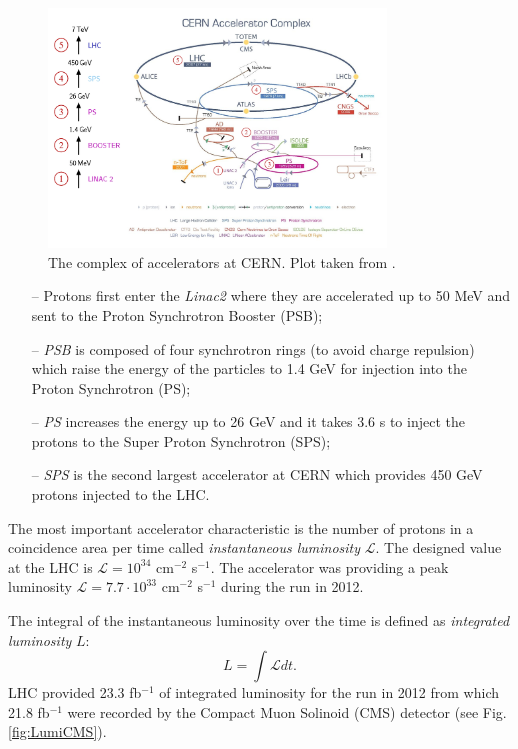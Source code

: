 \begin{figure}[t]
  \centering
  \includegraphics[width=0.8\textwidth]{02_experimental_setup/plots/Cern-Accelerator-Complex-2.png}
  \caption{The complex of accelerators at CERN. Plot taken from \cite{Fayette:2009zi}.}
  \label{fig:AccelCERN}
\end{figure}

\begin{itemize}
 \item[--] Protons first enter the \textit{Linac2} \cite{Arnaudon:1004186} where they are accelerated up to 50 MeV and sent to the Proton Synchrotron Booster (PSB);
 \item[--] \textit{PSB}\cite{Benedikt:2000bs} is composed of four synchrotron rings (to avoid charge repulsion) which raise the energy of the particles to 1.4 GeV
 for injection into the Proton Synchrotron (PS);
 \item[--] \textit{PS}\cite{Benedikt:2000bs} increases the energy up to 26 GeV and it takes 3.6 s to inject the protons to the Super Proton Synchrotron (SPS); 
 \item[--] \textit{SPS}\cite{Benedikt:2000bs} is the second largest accelerator at CERN which provides 450 GeV protons injected to the LHC.
\end{itemize}

The most important accelerator characteristic is the number of protons 
in a coincidence area per time called \textit{instantaneous luminosity} $\mathcal{L}$. The designed value 
at the LHC is $\mathcal{L} = 10^{34}$ cm$^{-2}$ s$^{-1}$. The accelerator was providing a peak luminosity 
$\mathcal{L} = 7.7 \cdot 10^{33}$ cm$^{-2}$ s$^{-1}$ during the run in 2012.

The integral of the instantaneous luminosity over the time
is defined as \textit{integrated luminosity} $L$: 
\begin{equation}\label{eq:lumi}
  L  = \int\mathcal{L}dt.
\end{equation}
LHC provided 23.3 fb$^{-1}$ of integrated luminosity for the run in 2012 from which 21.8 fb$^{-1}$ were
recorded by the Compact Muon Solinoid (CMS) detector (see Fig.\ref{fig:LumiCMS}).


